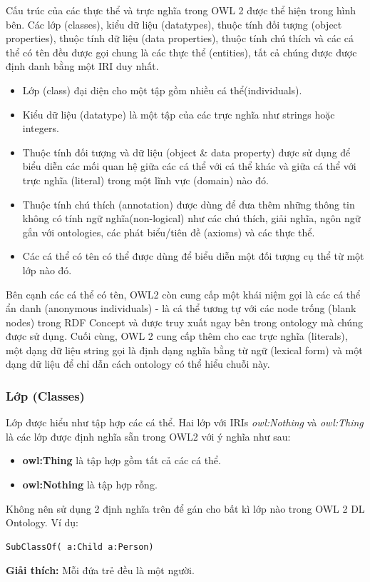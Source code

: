 Cấu trúc của các thực thể và trực nghĩa trong OWL 2 được thể hiện trong hình bên. Các lớp (classes), kiểu dữ liệu (datatypes), thuộc tính đối tượng (object properties), thuộc tính dữ liệu (data properties), thuộc tính chú thích và các cá thể có tên đều được gọi chung là các thực thể (entities), tất cả chúng được được định danh bằng một IRI duy nhất. 
\begin{itemize}
\item Lớp (class) đại diện cho một tập gồm nhiều cá thể(individuals).
\item Kiểu dữ liệu (datatype) là một tập của các trực nghĩa như strings hoặc integers.
\item Thuộc tính đối tượng và dữ liệu (object \& data property) được sử dụng để biểu diễn các mối quan hệ giữa các cá thể với cá thể khác và giữa cá thể với trực nghĩa (literal) trong một lĩnh vực (domain) nào đó.
\item Thuộc tính chú thích (annotation) được dùng để đưa thêm những thông tin không có tính ngữ nghĩa(non-logical) như các chú thích, giải nghĩa, ngôn ngữ gắn với ontologies, các phát biểu/tiên đề (axioms) và các thực thể.
\item  Các cá thể có tên có thể được dùng để biểu diễn một đối tượng cụ thể từ một lớp nào đó.
\end{itemize}
Bên cạnh các cá thể có tên, OWL2 còn cung cấp một khái niệm gọi là các cá thể ẩn danh (anonymous individuals) - là cá thể tương tự với các node trống (blank nodes) trong RDF Concept \cite{rdf_concept} và được truy xuất ngay bên trong ontology mà chúng được sử dụng. Cuối cùng, OWL 2 cung cấp thêm cho cac trực nghĩa (literals), một dạng dữ liệu string gọi là định dạng nghĩa bằng từ ngữ (lexical form) và một dạng dữ liệu để chỉ dẫn cách ontology có thể hiểu chuỗi này.
\subsubsection{Lớp (Classes)}
Lớp được hiểu như tập hợp các cá thể. Hai lớp với IRIs \textit{owl:Nothing} và \textit{owl:Thing} là các lớp được định nghĩa sẵn trong OWL2 với ý nghĩa như sau:
\begin{itemize}
\item \textbf{owl:Thing} là tập hợp gồm tất cả các cá thể.
\item \textbf{owl:Nothing} là tập hợp rỗng.
\end{itemize}
Không nên sử dụng 2 định nghĩa trên để gán cho bất kì lớp nào trong OWL 2 DL Ontology. Ví dụ:
\begin{verbatim}
SubClassOf( a:Child a:Person) 
\end{verbatim}
\textbf{Giải thích:} Mỗi đứa trẻ đều là một người.

